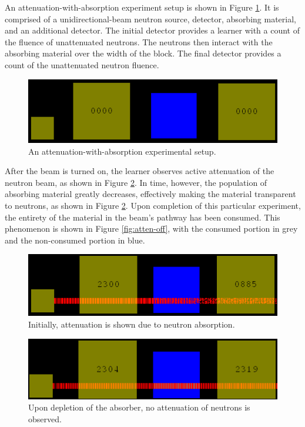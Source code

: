 \documentclass{anstrans}
\begin{document}
An attenuation-with-absorption experiment setup is shown in Figure
\ref{fig:atten-setup}. It is comprised of a unidirectional-beam neutron source,
detector, absorbing material, and an additional detector. The initial detector
provides a learner with a count of the fluence of unattenuated neutrons. The
neutrons then interact with the absorbing material over the width of the
block. The final detector provides a count of the unattenuated neutron fluence.

\begin{figure}
    \centering
    \includegraphics[width=\columnwidth]{atten-setup.png}
    \caption{An attenuation-with-absorption experimental setup.}
    \label{fig:atten-setup}
\end{figure}

After the beam is turned on, the learner observes active attenuation of the
neutron beam, as shown in Figure \ref{fig:atten-on}. In time, however, the
population of absorbing material greatly decreases, effectively making the
material transparent to neutrons, as shown in Figure \ref{fig:atten-on}. Upon
completion of this particular experiment, the entirety of the material in the
beam's pathway has been consumed. This phenomenon is shown in Figure
\ref{fig:atten-off}, with the consumed portion in grey and the non-consumed
portion in blue.

\begin{figure}
    \centering
    \includegraphics[width=\columnwidth]{atten-on.png}
    \caption{Initially, attenuation is shown due to neutron absorption.}
    \label{fig:atten-on}
\end{figure}

\begin{figure}
    \centering
    \includegraphics[width=\columnwidth]{atten-done.png}
    \caption{Upon depletion of the absorber, no attenuation of neutrons is observed.}
    \label{fig:atten-done}
\end{figure}
\end{document}
